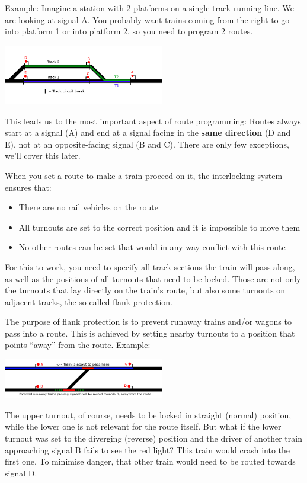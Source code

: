 \documentclass[english]{paper}
\begin{document}
Example: Imagine a station with 2 platforms on a single track running
line. We are looking at signal A. You probably want trains coming
from the right to go into platform 1 or into platform 2, so you need
to program 2 routes.

\includegraphics[width=7cm]{6_home_moritz_Home_Projekte_Minetest_minetest_mods_advtrains_assets_lyx_img_route_ex1.png}

This leads us to the most important aspect of route programming: Routes
always start at a signal (A) and end at a signal facing in the \textbf{same
direction} (D and E), not at an opposite-facing signal (B and C).
There are only few exceptions, we'll cover this later.

When you set a route to make a train proceed on it, the interlocking
system ensures that:
\begin{itemize}
\item There are no rail vehicles on the route
\item All turnouts are set to the correct position and it is impossible
to move them
\item No other routes can be set that would in any way conflict with this
route
\end{itemize}
For this to work, you need to specify all track sections the train
will pass along, as well as the positions of all turnouts that need
to be locked. Those are not only the turnouts that lay directly on
the train's route, but also some turnouts on adjacent tracks, the
so-called flank protection.

The purpose of flank protection is to prevent runaway trains and/or
wagons to pass into a route. This is achieved by setting nearby turnouts
to a position that points ``away'' from the route. Example:

\includegraphics[width=7cm]{7_home_moritz_Home_Projekte_Minetest_minetest_mods_advtrains_assets_lyx_img_route_ex2.png}

The upper turnout, of course, needs to be locked in straight (normal)
position, while the lower one is not relevant for the route itself.
But what if the lower turnout was set to the diverging (reverse) position
and the driver of another train approaching signal B fails to see
the red light? This train would crash into the first one. To minimise
danger, that other train would need to be routed towards signal D.
\end{document}
